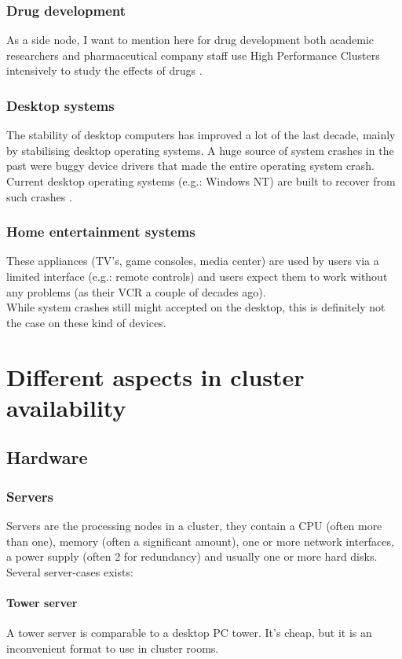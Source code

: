 \documentclass[12pt]{report}
\begin{document}
\subsection{Drug development}
As a side node, I want to mention here for drug development both
academic researchers and pharmaceutical company staff use High
Performance Clusters intensively to study the effects of drugs
\cite{deforche2007bayesian} \cite{lengauer2006bioinformatics}.

\subsection{Desktop systems}
The stability of desktop computers has improved a lot of the last decade,
mainly by stabilising desktop operating systems. A huge source of system
crashes in the past were buggy device drivers that made the entire
operating system crash.
Current desktop operating systems
(e.g.: Windows NT) are built to recover from such crashes
\cite{windows_nt_kernel}.

\subsection{Home entertainment systems}
These appliances (TV's, game consoles, media center) are used by users via a limited interface (e.g.:
remote controls) and users expect them to work without any problems
(as their VCR a  couple of decades ago).\\
While system crashes still might accepted on the desktop, this is
definitely not the case on these kind of devices. 


\chapter{Different aspects in cluster availability}
\label{chap:aspects}
\section{Hardware}
\subsection{Servers}
Servers are the processing nodes in a cluster, they contain a CPU
(often more than one), memory (often a significant amount), one or
more network interfaces, a power supply (often 2 for redundancy) and
usually one or more hard disks.\\
Several server-cases exists:
\subsubsection{Tower server} 
A tower server is comparable to a desktop PC tower. It's cheap, but it is
  an inconvenient format to use in cluster rooms.
\end{document}
